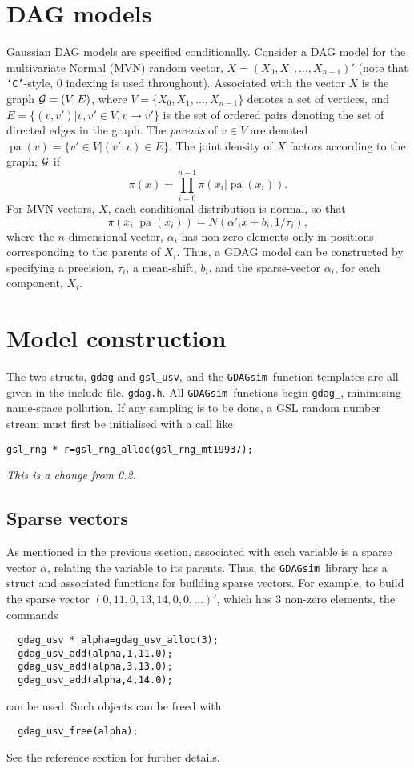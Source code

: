 \documentclass[12pt,a4paper]{article}
\newcommand{\gds}{\texttt{GDAGsim}}
\newcommand{\C}{\texttt{`C'}}
\newcommand{\pa}[1]{\operatorname{pa}(#1)}
\begin{document}
\section{DAG models}

Gaussian DAG models are specified conditionally. Consider a DAG model
for the multivariate Normal (MVN) random vector,
$X=(X_0,X_1,\ldots,X_{n-1})'$ (note that \C-style, 0 indexing is used
throughout). Associated with the vector $X$ is the graph ${\cal
G}=(V,E)$, where $V=\{X_0,X_1,\ldots,X_{n-1}\}$ denotes a set of
vertices, and $E=\{(v,v')|v,v'\in V, v\rightarrow v'\}$ is the set of
ordered pairs denoting the set of directed edges in the graph. The
\emph{parents} of $v\in V$ are denoted $\pa{v}=\{v'\in V|(v',v)\in E \}$. 
The joint density of $X$ factors according to the graph, ${\cal G}$ if
\[
\pi(x) = \prod_{i=0}^{n-1} \pi(x_i|\pa{x_i}).
\]
For MVN vectors, $X$, each conditional distribution is normal, so that
\[
\pi(x_i|\pa{x_i}) = N(\alpha'_i x+b_i,1/\tau_i),
\]  
where the $n$-dimensional vector, $\alpha_i$ has non-zero elements
only in positions corresponding to the parents of $X_i$. Thus, a GDAG
model can be constructed by specifying a precision, $\tau_i$, a
mean-shift, $b_i$, and the sparse-vector $\alpha_i$, for each
component, $X_i$.

\section{Model construction}

The two structs, \texttt{gdag} and
\verb$gsl_usv$, and the \gds\ function templates are all given in
the include file, \texttt{gdag.h}. All \gds\ functions begin
\verb$gdag_$, minimising name-space pollution. If any sampling is to
be done, a GSL random number stream must first be initialised with a call
like
\begin{verbatim}
gsl_rng * r=gsl_rng_alloc(gsl_rng_mt19937);
\end{verbatim}
\emph{This is a change from 0.2.}

\subsection{Sparse vectors}

As mentioned in the previous section, associated with each variable
is a sparse vector $\alpha$, relating the variable to its
parents. Thus, the \gds\ library has a struct and associated functions 
for building sparse vectors. For example, to build the sparse vector
$(0,11,0,13,14,0,0,\ldots)'$, which has 3 non-zero elements, the commands
\begin{verbatim}
  gdag_usv * alpha=gdag_usv_alloc(3);
  gdag_usv_add(alpha,1,11.0);
  gdag_usv_add(alpha,3,13.0);
  gdag_usv_add(alpha,4,14.0);
\end{verbatim}
can be used. Such objects can be freed with
\begin{verbatim}
  gdag_usv_free(alpha);
\end{verbatim}
See the reference section for further details.
\end{document}
